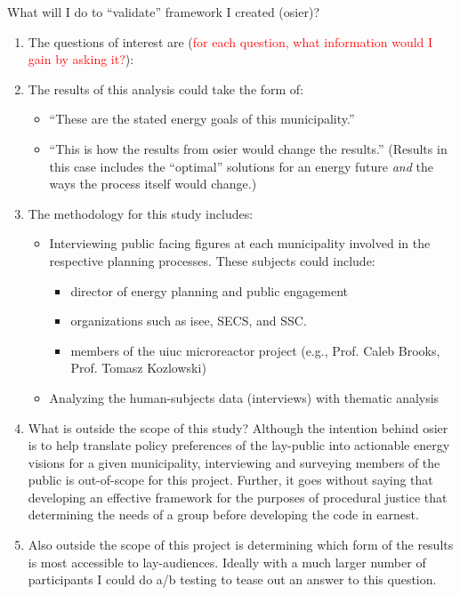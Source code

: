 What will I do to ``validate'' framework I created (\ac{osier})?
\begin{enumerate}
    \item The questions of interest are (\textcolor{red}{for each question, what
    information would I gain by asking it?}):

    \item The results of this analysis could take the form of:
    \begin{itemize}
        \item ``These are the stated energy goals of this municipality.''
        \item ``This is how the results from \ac{osier} would change the
        results.'' (Results in this case includes the ``optimal'' solutions for
        an energy future \textit{and} the ways the process itself would change.)
    \end{itemize}
    \item The methodology for this study includes:
    \begin{itemize}
        \item Interviewing public facing figures at each municipality involved
        in the respective planning processes. These subjects could include:
        \begin{itemize}
            \item director of energy planning and public engagement
            \item organizations such as \ac{isee}, SECS, and SSC. 
            \item members of the \ac{uiuc} microreactor project (e.g., Prof.
            Caleb Brooks, Prof. Tomasz Kozlowski)
        \end{itemize}
        \item Analyzing the human-subjects data (interviews) with thematic
        analysis
    \end{itemize}
    \item What is outside the scope of this study? Although the intention behind
    \ac{osier} is to help translate policy preferences of the lay-public into
    actionable energy visions for a given municipality, interviewing and
    surveying members of the public is out-of-scope for this project. Further,
    it goes without saying that developing an effective framework for the
    purposes of procedural justice that determining the needs of a group before
    developing the code in earnest.
    \item Also outside the scope of this project is determining which form of
    the results is most accessible to lay-audiences. Ideally with a much larger
    number of participants I could do a/b testing to tease out an answer to this
    question.
\end{enumerate}